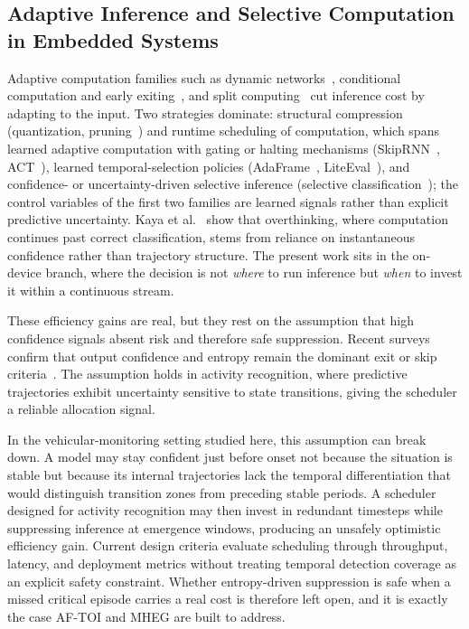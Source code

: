 \documentclass[a4paper,fleqn]{cas-dc}
\newcommand{\AFTOI}{\mbox{AF-TOI}\xspace}
\newcommand{\MHEG}{\mbox{MHEG}\xspace}
\begin{document}
\subsection{Adaptive Inference and Selective Computation in Embedded Systems}
\label{sec:rel_edgeai}
Adaptive computation families such as dynamic networks~\cite{han2022dynamic,montello2025dynamic}, conditional computation and early exiting~\cite{scardapane2024conditional,rahmath2024earlyexit,teerapittayanon2016branchynet,laskaridis2021adaptive}, and split computing~\cite{matsubara2022split,laskaridis2020hapi} cut inference cost by adapting to the input. Two strategies dominate: structural compression (quantization, pruning~\cite{hariharan2023driveredge}) and runtime scheduling of computation{\color{\revcolor}, which spans learned adaptive computation with gating or halting mechanisms (SkipRNN~\cite{campos2018skip}, ACT~\cite{graves2016adaptive}), learned temporal-selection policies (AdaFrame~\cite{wu2019adaframe}, LiteEval~\cite{wu2019liteeval}), and confidence- or uncertainty-driven selective inference (selective classification~\cite{geifman2017selective}); the control variables of the first two families are learned signals rather than explicit predictive uncertainty}. Kaya et al.~\cite{kaya2019shallow} show that overthinking, where computation continues past correct classification, stems from reliance on instantaneous confidence rather than trajectory structure. The present work sits in the on-device branch, where the decision is not \emph{where} to run inference but \emph{when} to invest it within a continuous stream.

These efficiency gains are real, but they rest on the assumption that high
confidence signals absent risk and therefore safe suppression. Recent surveys
confirm that output confidence and entropy remain the dominant exit or skip
criteria~\cite{rahmath2024earlyexit}. The assumption holds in activity
recognition, where predictive trajectories exhibit uncertainty sensitive to
state transitions, giving the scheduler a reliable allocation signal.

{\color{\revcolor}In the vehicular-monitoring setting studied here, this assumption can break down.} A model may stay confident
just before onset not because the situation is stable but because its internal
trajectories lack the temporal differentiation that would distinguish
transition zones from preceding stable periods. A scheduler designed for
activity recognition may then invest in redundant timesteps while suppressing
inference at emergence windows, producing an unsafely optimistic efficiency
gain. Current design criteria evaluate scheduling through throughput, latency,
and deployment metrics without treating temporal detection coverage as an
explicit safety constraint. Whether entropy-driven suppression is safe when a
missed critical episode carries a real cost is therefore left open, and it is
exactly the case \AFTOI and \MHEG are built to address.
\end{document}
